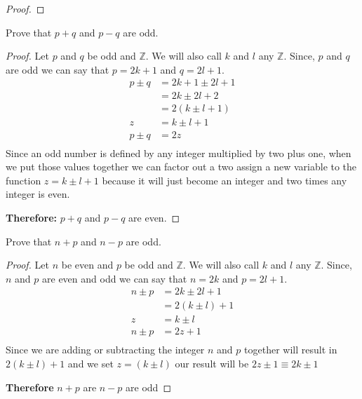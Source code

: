 \documentclass{article}
\begin{document}
\begin{itemize}
\begin{proof}
    \end{proof}
    \item[]
    \item[c.] Prove that $p + q$ and $p - q$ are odd.
    \item[]
        \begin{proof}
            Let $p$ and $q$ be odd and $\mathbb{Z}$. We will also call $k$ and $l$ any $\mathbb{Z}$. 
            Since, $p$ and $q$ are odd we can say that $p = 2k + 1$ and $q = 2l + 1$.
            \begin{align*}
                p \pm q &= 2k + 1 \pm 2l + 1 \\
                &= 2k \pm 2l + 2 \\
                &= 2(k \pm l + 1) \\
                z &= k \pm l + 1 \\
                p \pm q &= 2z \\
            \end{align*}
            Since an odd number is defined by any integer multiplied by two plus one, when we put those values together we
            can factor out a two assign a new variable to the function $ z = k \pm l + 1$ because it will just become an integer
            and two times any integer is even.
            \item[]
            \textbf{Therefore:} $p + q$ and $p - q$ are even.
        \end{proof}
    \item[d.] Prove that $n + p$ and $n - p$ are odd.
    \item[]
    \begin{proof}
        Let $n$ be even and $p$ be odd and $\mathbb{Z}$. We will also call $k$ and $l$ any $\mathbb{Z}$.
        Since, $n$ and $p$ are even and odd we can say that $n = 2k$ and $p = 2l + 1$.
        \begin{align*}
        n \pm p &= 2k \pm 2l + 1 \\
        &= 2(k \pm l) + 1 \\
       z &= k \pm l \\
       n \pm p &= 2z + 1 \\
        \end{align*}
    Since we are adding or subtracting the integer $n$ and $p$ together will result in $2(k \pm l) + 1$ and
    we set $z = (k \pm l)$ our result will be $2z \pm 1 \equiv 2k \pm 1$ 
    \item[]
        \textbf{Therefore} $n + p$ are $n - p$ are odd
    \end{proof}
\end{itemize}
\end{document}
